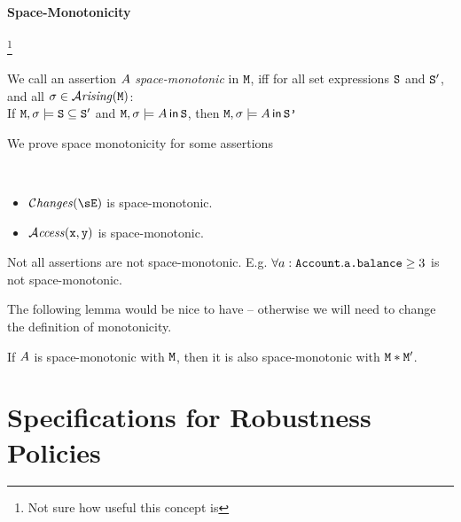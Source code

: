 \paragraph{Space-Monotonicity}\footnote{Not sure how useful this concept is}

\begin{definition}
We call an assertion $A$ {\em space-monotonic} in ${\mbox{\tt{M}}}$, iff for all set expressions ${\mbox{\tt{S}}}$ and  ${\mbox{\tt{S}}}'$,
 and all $\sigma\in{\mathcal{A}}\textrm{\textit{rising}}({{\mbox{\tt{M}}}})$:
 \\
  If  ${\mbox{\tt{M}}},\sigma\models  {\mbox{\tt{S}}} \subseteq {\mbox{\tt{S}}}'$ and ${\mbox{\tt{M}}},\sigma\models  A\,{\bf{\sf {in}}}\, {\mbox{\tt{S}}}$, then
${\mbox{\tt{M}}},\sigma\models  A\,{\bf{\sf {in}}}\,  {\mbox{\tt{S'}}}$
\end{definition}

We prove space monotonicity for some assertions

\begin{lemma}
$ ~ $

\begin{itemize}
\item
${\Changes \sE} $ is space-monotonic.
\item
${\mathcal{A}}\textrm{\textit{ccess}}({\mbox{\tt{x}}},{\mbox{\tt{y}}})$ is space-monotonic.

\end{itemize}
\end{lemma}

Not all assertions  are not space-monotonic. E.g. $\forall a:{\mbox{\tt{Account}}}.{\mbox{\tt{a.balance}}}\geq 3$ is not space-monotonic.


The following lemma would be nice to have -- otherwise we will need to change the definition of monotonicity.

\begin{lemma}
If $A$ is space-monotonic with ${\mbox{\tt{M}}}$, then it is also space-monotonic with ${\mbox{\tt{M}}}*{\mbox{\tt{M}}}'$.
\end{lemma}


 \section{Specifications for Robustness Policies}

